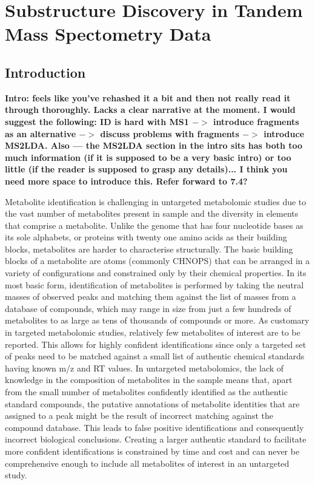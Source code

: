 \chapter{Substructure Discovery in Tandem Mass Spectometry Data}
\label{c:background}

\section{Introduction}

\textbf{Intro: feels like you’ve rehashed it a bit and then not really read it through thoroughly. Lacks a clear narrative at the moment. I would suggest the following: ID is hard with MS1 $->$ introduce fragments as an alternative $->$ discuss problems with fragments $->$ introduce MS2LDA. Also — the MS2LDA section in the intro sits has both too much information (if it is supposed to be a very basic intro) or too little (if the reader is supposed to grasp any details)... I think you need more space to introduce this. Refer forward to 7.4?}

Metabolite identification is challenging in untargeted metabolomic studies due to the vast number of metabolites present in sample and the diversity in elements that comprise a metabolite. Unlike the genome that has four nucleotide bases as its sole alphabets, or proteins with twenty one amino acids as their building blocks, metabolites are harder to characterise structurally. The basic building blocks of a metabolite are atoms (commonly CHNOPS) that can be arranged in a variety of configurations and constrained only by their chemical properties. In its most basic form, identification of metabolites is performed by taking the neutral masses of observed peaks and matching them against the list of masses from a database of compounds, which may range in size from just a few hundreds of metabolites to as large as tens of thousands of compounds or more. As customary in targeted metabolomic studies, relatively few metabolites of interest are to be reported. This allows for highly confident identifications since only a targeted set of peaks need to be matched against a small list of authentic chemical standards having known m/z and RT values. In untargeted metabolomics, the lack of knowledge in the composition of metabolites in the sample means that, apart from the small number of metabolites confidently identified as the authentic standard compounds, the putative annotations of metabolite identities that are assigned to a peak might be the result of incorrect matching against the compound database. This leads to false positive identifications and consequently incorrect biological conclusions. Creating a larger authentic standard to facilitate more confident identifications is constrained by time and cost and can never be comprehensive enough to include all metabolites of interest in an untargeted study. 

